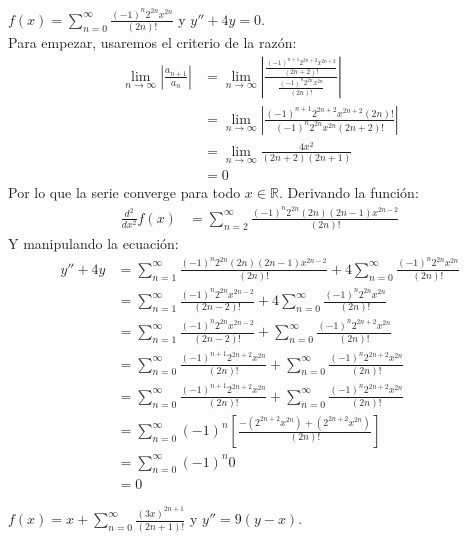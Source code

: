 \documentclass[../main.tex]{subfiles}
\begin{document}
\question $f(x) = \sum\limits_{n = 0}^\infty \frac{(-1)^n 2^{2n} x^{2n}}{(2n)!}$ y $y''+4y=0$.\\

Para empezar, usaremos el criterio de la razón:
\begin{align*}
    \lim_{n \to \infty} \left|\frac{a_{n+1}}{a_n}\right| &= \lim_{n \to \infty} \left|\frac{\frac{(-1)^{n+1} 2^{2n+2} x^{2n+2}}{(2n+2)!}}{\frac{(-1)^n 2^{2n} x^{2n}}{(2n)!}}\right|\\
    &= \lim_{n \to \infty} \left|\frac{(-1)^{n+1} 2^{2n+2} x^{2n+2} (2n)!}{(-1)^n 2^{2n} x^{2n} (2n+2)!}\right|\\
    &= \lim_{n \to \infty} \frac{4x^2}{(2n+2)(2n+1)}\\
    &= 0
\end{align*}
Por lo que la serie converge para todo $x \in \mathbb{R}$. Derivando la función:
\begin{align*}
    \frac{d^2}{dx^2} f(x) &= \sum_{n = 2}^\infty \frac{(-1)^n 2^{2n} (2n) (2n-1) x^{2n-2}}{(2n)!}
\end{align*} 
Y manipulando la ecuación:
\begin{align*}
    y'' + 4y &=  \sum_{n = 1}^\infty \frac{(-1)^n 2^{2n} (2n) (2n-1) x^{2n-2}}{(2n)!} + 4\sum_{n = 0}^\infty \frac{(-1)^n 2^{2n} x^{2n}}{(2n)!}\\
    &= \sum_{n = 1}^\infty \frac{(-1)^n 2^{2n} x^{2n-2}}{(2n-2)!} + 4\sum_{n = 0}^\infty \frac{(-1)^n 2^{2n} x^{2n}}{(2n)!}\\
    &= \sum_{n = 1}^\infty \frac{(-1)^n 2^{2n} x^{2n-2}}{(2n-2)!} + \sum_{n = 0}^\infty \frac{(-1)^n 2^{2n+2} x^{2n}}{(2n)!}\\
    &= \sum_{n = 0}^\infty \frac{(-1)^{n+1} 2^{2n+2} x^{2n}}{(2n)!} + \sum_{n = 0}^\infty \frac{(-1)^n 2^{2n+2} x^{2n}}{(2n)!}\\
    &= \sum_{n = 0}^\infty \frac{(-1)^{n+1} 2^{2n+2} x^{2n}}{(2n)!} + \sum_{n = 0}^\infty \frac{(-1)^n 2^{2n+2} x^{2n}}{(2n)!}\\
    &= \sum_{n = 0}^\infty (-1)^n \left[\frac{-(2^{2n+2} x^{2n}) + (2^{2n+2}x^{2n})}{(2n)!}\right]\\
    &= \sum_{n = 0}^\infty (-1)^n 0\\
    &= 0
\end{align*}

\question $f(x) = x + \sum\limits_{n = 0}^\infty \frac{(3x)^{2n+1}}{(2n+1)!}$ y $y'' = 9(y-x)$.\\
\end{document}
